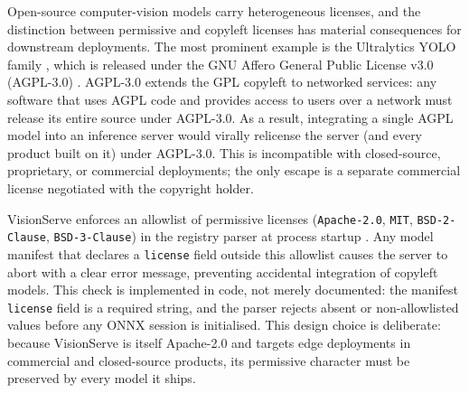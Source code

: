 Open-source computer-vision models carry heterogeneous licenses, and the distinction
between permissive and copyleft licenses has material consequences for downstream
deployments.  The most prominent example is the Ultralytics YOLO family
\cite{ultralytics2023yolo}, which is released under the GNU Affero General
Public License v3.0 (AGPL-3.0) \cite{agpllicense}.  AGPL-3.0 extends the GPL copyleft
to networked services: any software that uses AGPL code and provides access to
users over a network must release its entire source under AGPL-3.0.  As a result,
integrating a single AGPL model into an inference server would virally relicense the
server (and every product built on it) under AGPL-3.0.  This is incompatible with
closed-source, proprietary, or commercial deployments; the only escape is a separate
commercial license negotiated with the copyright holder.

VisionServe enforces an allowlist of permissive licenses
(\texttt{Apache-2.0}, \texttt{MIT}, \texttt{BSD-2-Clause}, \texttt{BSD-3-Clause})
in the registry parser at process startup \cite{apachelicense}.  Any model manifest
that declares a \texttt{license} field outside this allowlist causes the server to
abort with a clear error message, preventing accidental integration of copyleft models.
This check is implemented in code, not merely documented: the manifest
\texttt{license} field is a required string, and the parser rejects absent or
non-allowlisted values before any ONNX session is initialised.  This design choice is
deliberate: because VisionServe is itself Apache-2.0 and targets edge deployments in
commercial and closed-source products, its permissive character must be preserved by
every model it ships.


